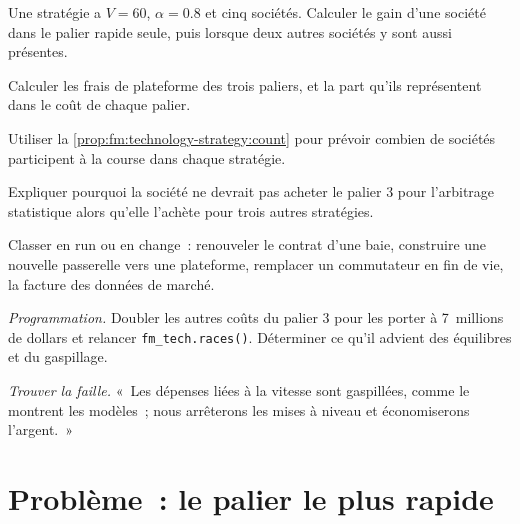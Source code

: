 \begin{exercise}[$\star$]\label{exo:fm:technology-strategy:2}
Une stratégie a $V=60$, $\alpha=0.8$ et cinq sociétés. Calculer le gain d'une société dans le palier rapide seule, puis lorsque deux autres sociétés y sont aussi présentes.
\end{exercise}

\begin{exercise}[$\star$]\label{exo:fm:technology-strategy:3}
Calculer les frais de plateforme des trois paliers, et la part qu'ils représentent dans le coût de chaque palier.
\end{exercise}

\begin{exercise}[$\star\star$]\label{exo:fm:technology-strategy:4}
Utiliser la \cref{prop:fm:technology-strategy:count} pour prévoir combien de sociétés participent à la course dans chaque stratégie.
\end{exercise}

\begin{exercise}[$\star\star$]\label{exo:fm:technology-strategy:5}
Expliquer pourquoi la société ne devrait pas acheter le palier 3 pour l'arbitrage statistique alors qu'elle l'achète pour trois autres stratégies.
\end{exercise}

\begin{exercise}[$\star\star$]\label{exo:fm:technology-strategy:6}
Classer en run ou en change~: renouveler le contrat d'une baie, construire une nouvelle passerelle vers une plateforme, remplacer un commutateur en fin de vie, la facture des données de marché.
\end{exercise}

\begin{exercise}[$\star\star\star$]\label{exo:fm:technology-strategy:7}
\emph{Programmation.} Doubler les autres coûts du palier 3 pour les porter à 7~millions de dollars et relancer \texttt{fm\_tech.races()}. Déterminer ce qu'il advient des équilibres et du gaspillage.
\end{exercise}

\begin{exercise}[$\star\star\star$]\label{exo:fm:technology-strategy:8}
\emph{Trouver la faille.} «~Les dépenses liées à la vitesse sont gaspillées, comme le montrent les modèles~; nous arrêterons les mises à niveau et économiserons l'argent.~»
\end{exercise}

\section{Problème~: le palier le plus rapide}


